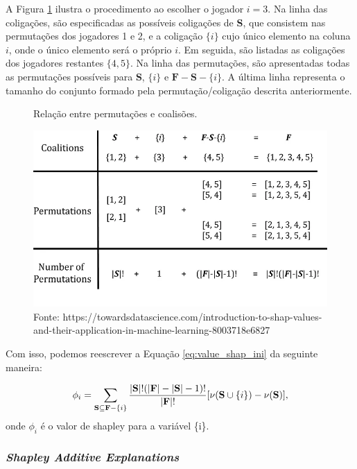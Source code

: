  A Figura \ref{fig:permut_e_colig} ilustra o procedimento ao escolher o jogador $i=3$.
Na linha das coligações, são especificadas as possíveis coligações de \textbf{S}, que consistem nas
permutações dos jogadores 1 e 2, e a coligação $\{i\}$ cujo único elemento na coluna ${i}$, onde
o único elemento será o próprio $i$. Em seguida, são listadas as coligações dos jogadores restantes $\{4, 5\}$. 
Na linha das permutações, são apresentadas todas as permutações possíveis para \textbf{S}, $\{i\}$ e $\textbf{F}-\textbf{S}-\{i\}$. 
A última linha representa o tamanho do conjunto formado pela permutação/coligação descrita anteriormente.

\begin{figure}[H]
    \centering
    \caption{Relação entre permutações e coalisões.}
    \includegraphics[scale=0.5]{imagens/shap1.png}
    \caption*{Fonte: https://towardsdatascience.com/introduction-to-shap-values-and-their-application-in-machine-learning-8003718e6827}
    \label{fig:permut_e_colig}
    
\end{figure}

Com isso, podemos reescrever a Equação \ref{eq:value_shap_ini} da seguinte maneira:

\[
\phi_i= 
\sum_{\textbf{S} \subseteq  \textbf{F} - \{i\}}
\frac{|\textbf{S}|!(|\textbf{F}| - |\textbf{S}| - 1)!}{|\textbf{F}|!}
[\nu(\textbf{S}\cup\{i\}) - \nu(\textbf{\textbf{S}})],
\]
\noindent\hspace{1.5cm} onde $\phi_i$ é o valor de shapley para a variável \{i\}.

\subsubsection{\textit{Shapley Additive Explanations}}


